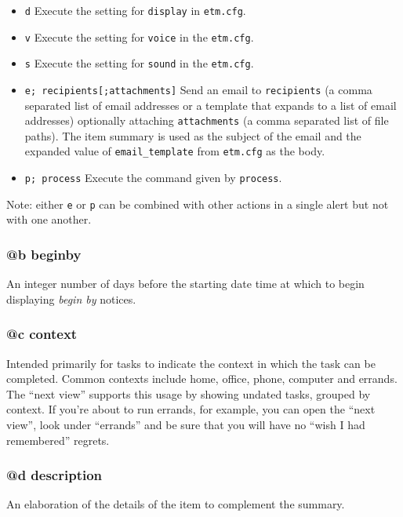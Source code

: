 \documentclass[]{article}
\begin{document}
\begin{itemize}
\item
  \texttt{d} Execute the setting for \texttt{display} in
  \texttt{etm.cfg}.
\item
  \texttt{v} Execute the setting for \texttt{voice} in the
  \texttt{etm.cfg}.
\item
  \texttt{s} Execute the setting for \texttt{sound} in the
  \texttt{etm.cfg}.
\item
  \texttt{e; recipients{[};attachments{]}} Send an email to
  \texttt{recipients} (a comma separated list of email addresses or a
  template that expands to a list of email addresses) optionally
  attaching \texttt{attachments} (a comma separated list of file paths).
  The item summary is used as the subject of the email and the expanded
  value of \texttt{email\_template} from \texttt{etm.cfg} as the body.
\item
  \texttt{p; process} Execute the command given by \texttt{process}.
\end{itemize}

Note: either \texttt{e} or \texttt{p} can be combined with other actions
in a single alert but not with one another.

\subsubsection{@b beginby}

An integer number of days before the starting date time at which to
begin displaying \emph{begin by} notices.

\subsubsection{@c context}

Intended primarily for tasks to indicate the context in which the task
can be completed. Common contexts include home, office, phone, computer
and errands. The ``next view'' supports this usage by showing undated
tasks, grouped by context. If you're about to run errands, for example,
you can open the ``next view'', look under ``errands'' and be sure that
you will have no ``wish I had remembered'' regrets.

\subsubsection{@d description}

An elaboration of the details of the item to complement the summary.
\end{document}
